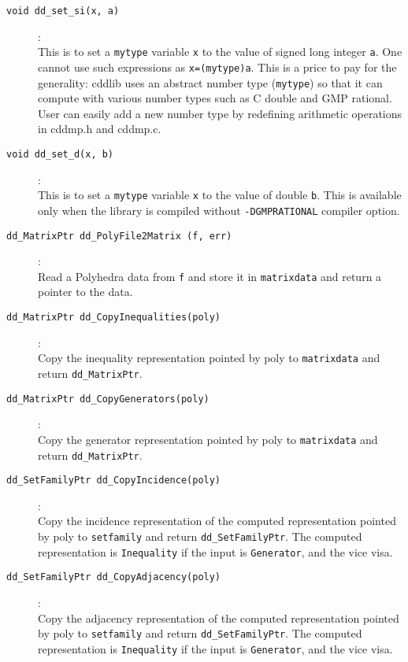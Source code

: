 \documentclass[11pt]{article}
\newcommand {\0} {{\bf 0}}
\begin{document}
\begin{description}

\item[{\tt void dd\_set\_si(x, a)}]:\\
This is to set a {\tt mytype} variable {\tt x} to the
value of signed long integer {\tt a}.  One
 cannot use such expressions as {\tt x=(mytype)a}.
This is a price to pay for the generality:
cddlib uses an abstract number type ({\tt mytype}) 
so that it can compute with various 
number types such as C double and GMP rational.
User can easily add a new number type by redefining
arithmetic operations in cddmp.h and cddmp.c.

\item[{\tt void dd\_set\_d(x, b)}]:\\
This is to set a {\tt mytype} variable {\tt x} to the
value of double {\tt b}.  This is available only
when the library is compiled without {\tt -DGMPRATIONAL}
compiler option.

\item[{\tt dd\_MatrixPtr dd\_PolyFile2Matrix (f, err)}]:\\
Read a Polyhedra data from {\tt f} and store it in {\tt matrixdata}
and return a pointer to the data.

\item[{\tt dd\_MatrixPtr dd\_CopyInequalities(poly)}]:\\
Copy the inequality representation pointed by poly to {\tt matrixdata}
and return {\tt dd\_MatrixPtr}.

\item[{\tt dd\_MatrixPtr dd\_CopyGenerators(poly)}]:\\ 
Copy the generator representation pointed by poly to {\tt matrixdata}
and return {\tt dd\_MatrixPtr}.

\item[{\tt dd\_SetFamilyPtr dd\_CopyIncidence(poly)}]:\\ 
Copy the incidence representation of the computed representation
pointed by poly to {\tt setfamily}
and return {\tt dd\_SetFamilyPtr}.  The computed representation is
{\tt Inequality} if the input is {\tt Generator}, and the vice visa.

\item[{\tt dd\_SetFamilyPtr dd\_CopyAdjacency(poly)}]:\\ 
Copy the adjacency representation of the computed representation
pointed by poly to {\tt setfamily}
and return {\tt dd\_SetFamilyPtr}.  The computed representation is
{\tt Inequality} if the input is {\tt Generator}, and the vice visa.


\end{description}
\end{document}
